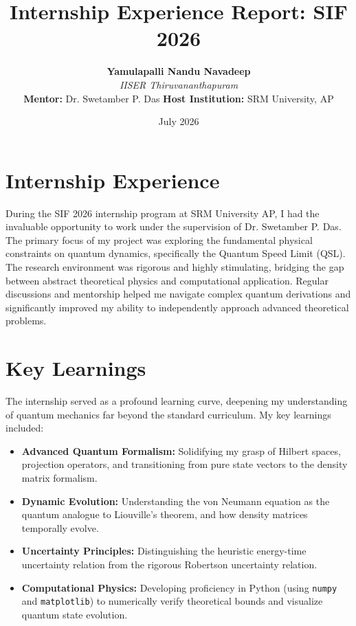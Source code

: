 \documentclass[11pt,a4paper]{article}
\title{\textbf{Internship Experience Report: SIF 2026}}
\author{
    \textbf{Yamulapalli Nandu Navadeep} \\
    \textit{IISER Thiruvananthapuram} \\[0.2cm]
    \textbf{Mentor:} Dr. Swetamber P. Das \quad \textbf{Host Institution:} SRM University, AP
}
\date{July 2026}
\begin{document}
\maketitle
\vspace{-1.5cm}

\section*{Internship Experience}
During the SIF 2026 internship program at SRM University AP, I had the invaluable opportunity to work under the supervision of Dr. Swetamber P. Das. The primary focus of my project was exploring the fundamental physical constraints on quantum dynamics, specifically the Quantum Speed Limit (QSL). The research environment was rigorous and highly stimulating, bridging the gap between abstract theoretical physics and computational application. Regular discussions and mentorship helped me navigate complex quantum derivations and significantly improved my ability to independently approach advanced theoretical problems.

\section*{Key Learnings}
The internship served as a profound learning curve, deepening my understanding of quantum mechanics far beyond the standard curriculum. My key learnings included:
\begin{itemize}[noitemsep,topsep=0pt]
    \item \textbf{Advanced Quantum Formalism:} Solidifying my grasp of Hilbert spaces, projection operators, and transitioning from pure state vectors to the density matrix formalism.
    \item \textbf{Dynamic Evolution:} Understanding the von Neumann equation as the quantum analogue to Liouville's theorem, and how density matrices temporally evolve.
    \item \textbf{Uncertainty Principles:} Distinguishing the heuristic energy-time uncertainty relation from the rigorous Robertson uncertainty relation.
    \item \textbf{Computational Physics:} Developing proficiency in Python (using \texttt{numpy} and \texttt{matplotlib}) to numerically verify theoretical bounds and visualize quantum state evolution.
\end{itemize}
\end{document}
